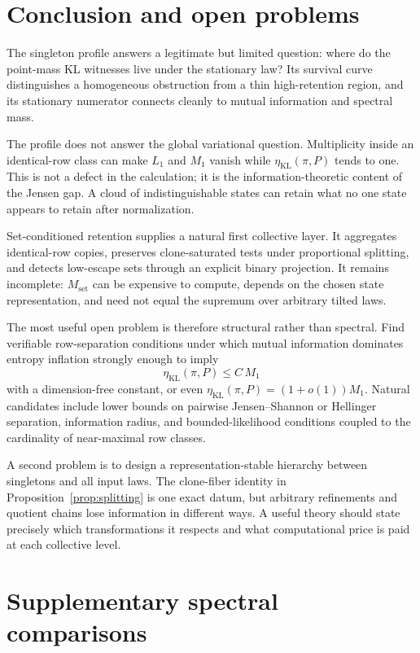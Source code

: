 \documentclass[11pt]{article}
\newcommand{\etaStat}{\eta_{\mathrm{KL}}(\pi,P)}
\newcommand{\Mone}{M_1}
\newcommand{\Lone}{L_1}
\newcommand{\Mset}{M_{\mathrm{set}}}
\begin{document}
\section{Conclusion and open problems}
\label{sec:conclusion}

The singleton profile answers a legitimate but limited question: where do
the point-mass KL witnesses live under the stationary law?  Its survival
curve distinguishes a homogeneous obstruction from a thin high-retention
region, and its stationary numerator connects cleanly to mutual information
and spectral mass.

The profile does not answer the global variational question.  Multiplicity
inside an identical-row class can make \(\Lone\) and \(\Mone\) vanish while
\(\etaStat\) tends to one.  This is not a defect in the calculation; it is
the information-theoretic content of the Jensen gap.  A cloud of
indistinguishable states can retain what no one state appears to retain
after normalization.

Set-conditioned retention supplies a natural first collective layer.
It aggregates identical-row copies, preserves clone-saturated tests under
proportional splitting, and detects low-escape sets through an explicit
binary projection.  It remains incomplete: \(\Mset\) can be expensive to compute,
depends on the chosen state representation, and need not equal the supremum over
arbitrary tilted laws.

The most useful open problem is therefore structural rather than spectral.
Find verifiable row-separation conditions under which mutual information
dominates entropy inflation strongly enough to imply
\[
  \etaStat\le C\,\Mone
\]
with a dimension-free constant, or even
\(\etaStat=(1+o(1))\Mone\).  Natural candidates include lower bounds on
pairwise Jensen--Shannon or Hellinger separation, information radius,
and bounded-likelihood conditions coupled to the cardinality of
near-maximal row classes.

A second problem is to design a representation-stable hierarchy between
singletons and all input laws.  The clone-fiber identity in
Proposition~\ref{prop:splitting} is one exact datum, but arbitrary
refinements and quotient chains lose information in different ways.
A useful theory should state precisely which transformations it respects
and what computational price is paid at each collective level.


\appendix

\section{Supplementary spectral comparisons}
\label{app:spectral}
\end{document}
